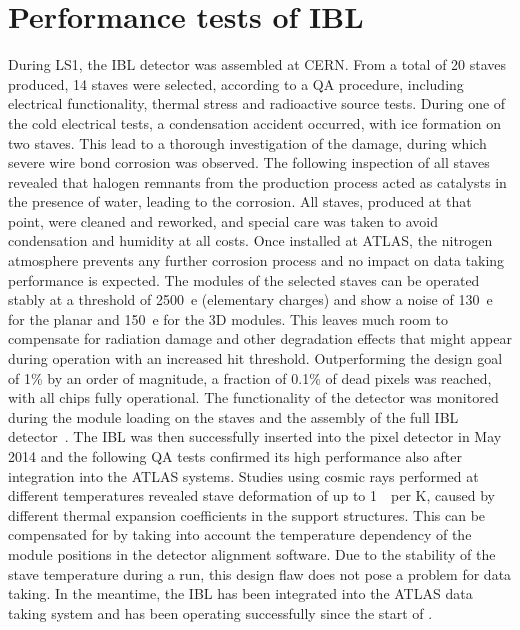 \section{Performance tests of IBL}
\label{sec:IBL}
During \gls{LS1}, the \gls{IBL} detector was assembled at \gls{CERN}. From a total of 20 staves produced, 14 staves were selected, according to a \gls{QA} procedure\cite{ATL-INDET-PUB-2014-006}, including electrical functionality, thermal stress and radioactive source tests. 
During one of the cold electrical tests, a condensation accident occurred, with ice formation on two staves. This lead to a thorough investigation of the damage, during which severe wire bond corrosion was observed. The following inspection of all staves revealed that halogen remnants from the production process acted as catalysts in the presence of water, leading to the corrosion. All staves, produced at that point, were cleaned and reworked, and special care was taken to avoid condensation and humidity at all costs. Once installed at \gls{ATLAS}, the nitrogen atmosphere prevents any further corrosion process and no impact on data taking performance is expected. 
%
The modules of the selected staves can be operated stably at a threshold of 2500~e (elementary charges) and show a noise of 130~e for the planar and 150~e for the 3D modules. This leaves much room to compensate for radiation damage and other degradation effects that might appear during operation with an increased hit threshold. 
%
Outperforming the design goal of 1\% by an order of magnitude, a fraction of 0.1\% of dead pixels was reached, with all chips fully operational. 
%
The functionality of the detector was monitored during the module loading on the staves and the assembly of the full \gls{IBL} detector~\cite{BilbaoDeMendizabal:1984087}.
%
The \gls{IBL} was then successfully inserted into the pixel detector in May 2014 and the following \gls{QA} tests confirmed its high performance also after integration into the \gls{ATLAS} systems. 
Studies using cosmic rays performed at different temperatures revealed stave deformation of up to 1~\mum\ per K, caused by different thermal expansion coefficients in the support structures. This can be compensated for by taking into account the temperature dependency of the module positions in the detector alignment software. Due to the stability of the stave temperature during a run, this design flaw does not pose a problem for data taking. 
%
In the meantime, the \gls{IBL} has been integrated into the \gls{ATLAS} data taking system and has been operating successfully since the start of \RunTwo. 

